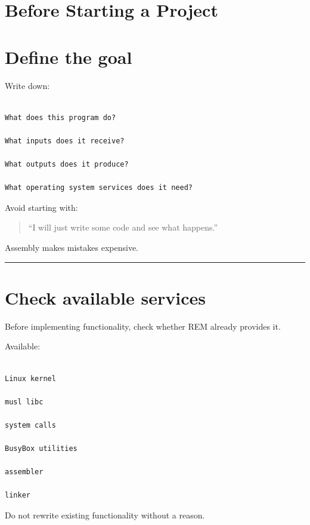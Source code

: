 \documentclass[
  oneside,
  openany]{book}
\begin{document}
\hypertarget{before-starting-a-project}{%
\section{Before Starting a Project}\label{before-starting-a-project}}

\hypertarget{define-the-goal}{%
\section{Define the goal}\label{define-the-goal}}

Write down:

\begin{verbatim}

What does this program do?

What inputs does it receive?

What outputs does it produce?

What operating system services does it need?
\end{verbatim}

Avoid starting with:

\begin{quote}
``I will just write some code and see what happens.''
\end{quote}

Assembly makes mistakes expensive.

\begin{center}\rule{0.5\linewidth}{0.5pt}\end{center}

\hypertarget{check-available-services}{%
\section{Check available services}\label{check-available-services}}

Before implementing functionality, check whether REM already provides
it.

Available:

\begin{verbatim}

Linux kernel

musl libc

system calls

BusyBox utilities

assembler

linker
\end{verbatim}

Do not rewrite existing functionality without a reason.
\end{document}
